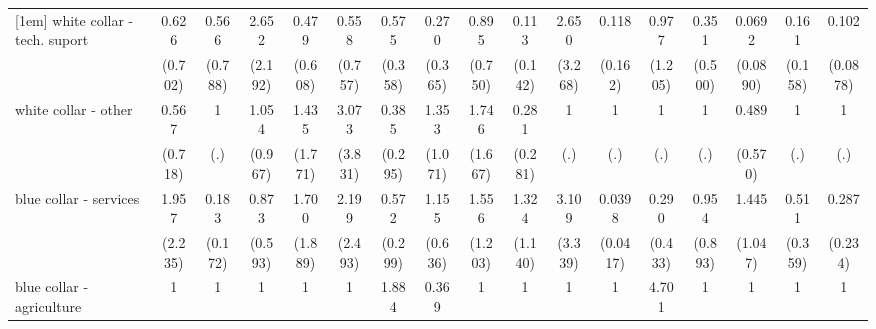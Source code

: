 {\begin{tabular}{l*{16}{c}}
[1em]
white collar - tech. suport&       0.626         &       0.566         &       2.652         &       0.479         &       0.558         &       0.575         &       0.270         &       0.895         &       0.113         &       2.650         &       0.118         &       0.977         &       0.351         &      0.0692\sym{*}  &       0.161         &       0.102\sym{**} \\
                    &     (0.702)         &     (0.788)         &     (2.192)         &     (0.608)         &     (0.757)         &     (0.358)         &     (0.365)         &     (0.750)         &     (0.142)         &     (3.268)         &     (0.162)         &     (1.205)         &     (0.500)         &    (0.0890)         &     (0.158)         &    (0.0878)         \\
[1em]
white collar - other&       0.567         &           1         &       1.054         &       1.435         &       3.073         &       0.385         &       1.353         &       1.746         &       0.281         &           1         &           1         &           1         &           1         &       0.489         &           1         &           1         \\
                    &     (0.718)         &         (.)         &     (0.967)         &     (1.771)         &     (3.831)         &     (0.295)         &     (1.071)         &     (1.667)         &     (0.281)         &         (.)         &         (.)         &         (.)         &         (.)         &     (0.570)         &         (.)         &         (.)         \\
[1em]
blue collar - services&       1.957         &       0.183         &       0.873         &       1.700         &       2.199         &       0.572         &       1.155         &       1.556         &       1.324         &       3.109         &      0.0398\sym{**} &       0.290         &       0.954         &       1.445         &       0.511         &       0.287         \\
                    &     (2.235)         &     (0.172)         &     (0.593)         &     (1.889)         &     (2.493)         &     (0.299)         &     (0.636)         &     (1.203)         &     (1.140)         &     (3.339)         &    (0.0417)         &     (0.433)         &     (0.893)         &     (1.047)         &     (0.359)         &     (0.234)         \\
[1em]
blue collar - agriculture&           1         &           1         &           1         &           1         &           1         &       1.884         &       0.369         &           1         &           1         &           1         &           1         &       4.701         &           1         &           1         &           1         &           1         \\

\end{tabular}}
